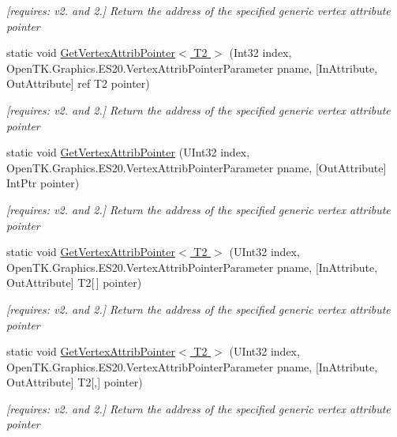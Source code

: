 \begin{DoxyCompactItemize}
\begin{DoxyCompactList}\small\item\em \mbox{[}requires\-: v2. and 2.\mbox{]} Return the address of the specified generic vertex attribute pointer \end{DoxyCompactList}\item 
static void \hyperlink{class_open_t_k_1_1_graphics_1_1_e_s20_1_1_g_l_a880d2c7c945c02c3ae9596927904c54e}{Get\-Vertex\-Attrib\-Pointer$<$ T2 $>$} (Int32 index, Open\-T\-K.\-Graphics.\-E\-S20.\-Vertex\-Attrib\-Pointer\-Parameter pname, \mbox{[}In\-Attribute, Out\-Attribute\mbox{]} ref T2 pointer)
\begin{DoxyCompactList}\small\item\em \mbox{[}requires\-: v2. and 2.\mbox{]} Return the address of the specified generic vertex attribute pointer \end{DoxyCompactList}\item 
static void \hyperlink{class_open_t_k_1_1_graphics_1_1_e_s20_1_1_g_l_a684a5292b2b811d3aabaa52bb0d74ce8}{Get\-Vertex\-Attrib\-Pointer} (U\-Int32 index, Open\-T\-K.\-Graphics.\-E\-S20.\-Vertex\-Attrib\-Pointer\-Parameter pname, \mbox{[}Out\-Attribute\mbox{]} Int\-Ptr pointer)
\begin{DoxyCompactList}\small\item\em \mbox{[}requires\-: v2. and 2.\mbox{]} Return the address of the specified generic vertex attribute pointer \end{DoxyCompactList}\item 
static void \hyperlink{class_open_t_k_1_1_graphics_1_1_e_s20_1_1_g_l_afc3e8a0d2fa4130f75fc9919706f0376}{Get\-Vertex\-Attrib\-Pointer$<$ T2 $>$} (U\-Int32 index, Open\-T\-K.\-Graphics.\-E\-S20.\-Vertex\-Attrib\-Pointer\-Parameter pname, \mbox{[}In\-Attribute, Out\-Attribute\mbox{]} T2\mbox{[}$\,$\mbox{]} pointer)
\begin{DoxyCompactList}\small\item\em \mbox{[}requires\-: v2. and 2.\mbox{]} Return the address of the specified generic vertex attribute pointer \end{DoxyCompactList}\item 
static void \hyperlink{class_open_t_k_1_1_graphics_1_1_e_s20_1_1_g_l_a447ee81bad459c50b6c720e528622e21}{Get\-Vertex\-Attrib\-Pointer$<$ T2 $>$} (U\-Int32 index, Open\-T\-K.\-Graphics.\-E\-S20.\-Vertex\-Attrib\-Pointer\-Parameter pname, \mbox{[}In\-Attribute, Out\-Attribute\mbox{]} T2\mbox{[},\mbox{]} pointer)
\begin{DoxyCompactList}\small\item\em \mbox{[}requires\-: v2. and 2.\mbox{]} Return the address of the specified generic vertex attribute pointer \end{DoxyCompactList}\item 

\end{DoxyCompactItemize}
